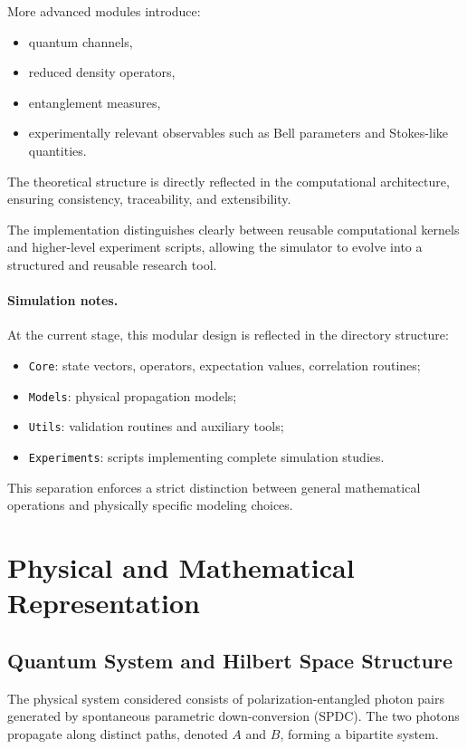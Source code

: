 \documentclass[a4paper]{article}
\begin{document}
More advanced modules introduce:
\begin{itemize}
    \item quantum channels,
    \item reduced density operators,
    \item entanglement measures,
    \item experimentally relevant observables such as Bell parameters and Stokes-like quantities.
\end{itemize}

The theoretical structure is directly reflected in the computational architecture, ensuring consistency, traceability, and extensibility.

The implementation distinguishes clearly between reusable computational kernels and higher-level experiment scripts, allowing the simulator to evolve into a structured and reusable research tool.

\paragraph{Simulation notes.}
At the current stage, this modular design is reflected in the directory structure:
\begin{itemize}
    \item \texttt{Core}: state vectors, operators, expectation values, correlation routines;
    \item \texttt{Models}: physical propagation models;
    \item \texttt{Utils}: validation routines and auxiliary tools;
    \item \texttt{Experiments}: scripts implementing complete simulation studies.
\end{itemize}

This separation enforces a strict distinction between general mathematical operations and physically specific modeling choices.

\section{Physical and Mathematical Representation}

\subsection{Quantum System and Hilbert Space Structure}

The physical system considered consists of polarization-entangled photon pairs generated by spontaneous parametric down-conversion (SPDC). The two photons propagate along distinct paths, denoted \(A\) and \(B\), forming a bipartite system.
\end{document}
